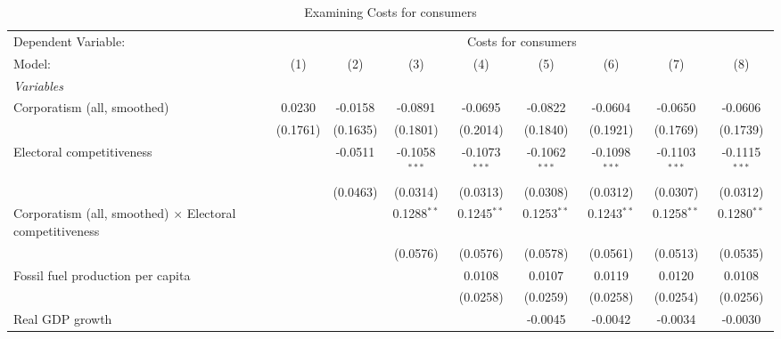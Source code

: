 
\begin{table}[htbp]
   \caption{Examining Costs for consumers}
   \centering
   \begin{tabular}{lcccccccc}
      \tabularnewline \midrule \midrule
      Dependent Variable: & \multicolumn{8}{c}{Costs for consumers}\\
      Model:                                                          & (1)      & (2)      & (3)             & (4)             & (5)             & (6)             & (7)             & (8)\\  
      \midrule
      \emph{Variables}\\
      Corporatism (all, smoothed)                                     & 0.0230   & -0.0158  & -0.0891         & -0.0695         & -0.0822         & -0.0604         & -0.0650         & -0.0606\\   
                                                                      & (0.1761) & (0.1635) & (0.1801)        & (0.2014)        & (0.1840)        & (0.1921)        & (0.1769)        & (0.1739)\\   
      Electoral competitiveness                                       &          & -0.0511  & -0.1058$^{***}$ & -0.1073$^{***}$ & -0.1062$^{***}$ & -0.1098$^{***}$ & -0.1103$^{***}$ & -0.1115$^{***}$\\   
                                                                      &          & (0.0463) & (0.0314)        & (0.0313)        & (0.0308)        & (0.0312)        & (0.0307)        & (0.0312)\\   
      Corporatism (all, smoothed) $\times$ Electoral competitiveness  &          &          & 0.1288$^{**}$   & 0.1245$^{**}$   & 0.1253$^{**}$   & 0.1243$^{**}$   & 0.1258$^{**}$   & 0.1280$^{**}$\\   
                                                                      &          &          & (0.0576)        & (0.0576)        & (0.0578)        & (0.0561)        & (0.0513)        & (0.0535)\\   
      Fossil fuel production per capita                               &          &          &                 & 0.0108          & 0.0107          & 0.0119          & 0.0120          & 0.0108\\   
                                                                      &          &          &                 & (0.0258)        & (0.0259)        & (0.0258)        & (0.0254)        & (0.0256)\\   
      Real GDP growth                                                 &          &          &                 &                 & -0.0045         & -0.0042         & -0.0034         & -0.0030\\   

\end{tabular}
\end{table}

